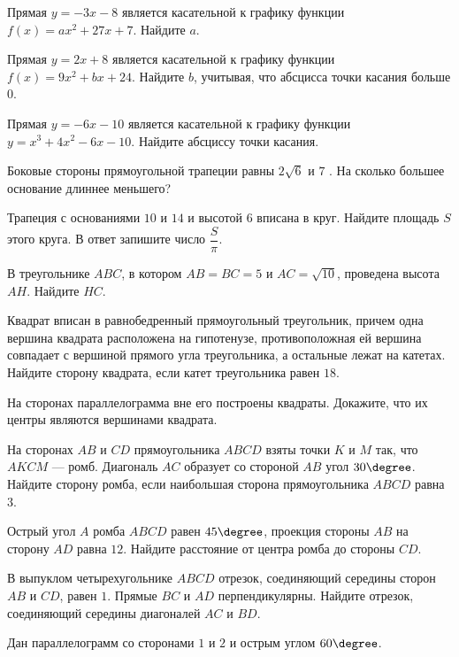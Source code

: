 \begin{class}[number=5]
	\begin{listofex}
		\item Прямая \( y=-3x-8 \) является касательной к графику функции \( f(x)=ax^2+27x+7 \). Найдите \( a \).
		\item Прямая \( y=2x+8 \) является касательной к графику функции \( f(x)=9x^2+bx+24 \). Найдите \( b \), учитывая, что абсцисса точки касания больше \( 0 \).
		\item Прямая \( y=-6x-10 \) является касательной к графику функции \( y=x^3+4x^2-6x-10 \). Найдите абсциссу точки касания.
		\item Боковые стороны прямоугольной трапеции равны \( 2\sqrt{6} \) и \( 7 \) . На сколько большее основание длиннее меньшего?
		\item Трапеция с основаниями \( 10 \) и \( 14 \) и высотой \( 6 \) вписана в круг. Найдите площадь \( S \) этого круга. В ответ запишите число \( \dfrac{S}{\pi} \).
		\item В треугольнике \( ABC \), в котором \( AB=BC =5 \) и \( AC =\sqrt{10} \), проведена высота \( AH \). Найдите \( HC \).
		\item Квадрат вписан в равнобедренный прямоугольный
		треугольник, причем одна вершина квадрата расположена на
		гипотенузе, противоположная ей вершина совпадает с вершиной прямого угла треугольника, а остальные лежат на катетах.
		Найдите сторону квадрата, если катет треугольника равен \( 18 \).
		\item На сторонах параллелограмма вне его построены квадраты. Докажите, что их центры являются вершинами квадрата.
		\item На сторонах \( AB \) и \( CD \) прямоугольника \( ABCD \) взяты точки \( K \) и \( M \) так, что \( AKCM \) --- ромб. Диагональ \( AC \) образует со стороной \( AB \) угол \( 30\degree \). Найдите сторону ромба, если наибольшая сторона прямоугольника \( ABCD \) равна \( 3 \).
		\item Острый угол \( A \) ромба \( ABCD \) равен \( 45\degree \), проекция стороны \( AB \) на сторону \( AD \) равна \( 12 \). Найдите расстояние от центра ромба до стороны \( CD \).
		\item В выпуклом четырехугольнике \( ABCD \) отрезок, соединяющий середины сторон \( AB \) и \( CD \), равен \( 1 \). Прямые \( BC \) и \( AD \)
		перпендикулярны. Найдите отрезок, соединяющий середины диагоналей \( AC \) и \( BD \).
		\item Дан параллелограмм со сторонами \( 1 \) и \( 2 \) и острым углом \( 60\degree \).

\end{listofex}
\end{class}
